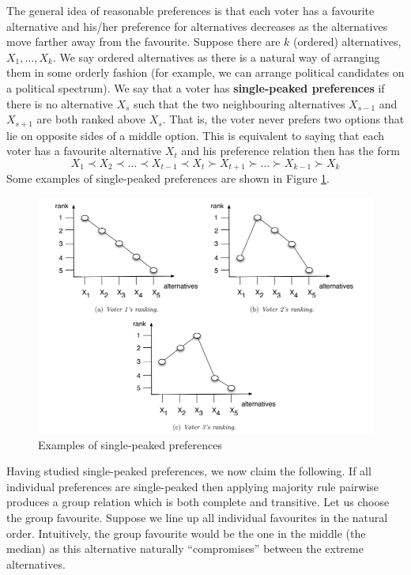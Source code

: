 \documentclass{article}
\theoremstyle{definition}
\begin{document}
The general idea of reasonable preferences is that each voter has a favourite alternative and his/her preference for alternatives decreases as the alternatives move farther away from the favourite. Suppose there are $k$ (ordered) alternatives, $X_1, \ldots , X_k$. We say ordered alternatives as there is a natural way of arranging them in some orderly fashion (for example, we can arrange political candidates on a political spectrum). We say that a voter has \textbf{single-peaked preferences} if there is no alternative $X_s$ such that the two neighbouring alternatives $X_{s-1}$ and $X_{s+1}$ are both ranked above $X_s$. That is, the voter never prefers two options that lie on opposite sides of a middle option. This is equivalent to saying that each voter has a favourite alternative $X_t$ and his preference relation then has the form
\[
    X_1 \prec X_2 \prec \ldots \prec X_{t-1} \prec X_t \succ X_{t+1} \succ \ldots \succ X_{k-1} \succ X_k
\]
Some examples of single-peaked preferences are shown in Figure \ref{fig:spp}.

\begin{figure}[h!]
    \centering
    \includegraphics[scale=0.6]{SPP.png}
    \caption{Examples of single-peaked preferences}
    \label{fig:spp}
\end{figure}

Having studied single-peaked preferences, we now claim the following. If all individual preferences are single-peaked then applying majority rule pairwise produces a group relation which is both complete and transitive. Let us choose the group favourite. Suppose we line up all individual favourites in the natural order. Intuitively, the group favourite would be the one in the middle (the median) as this alternative naturally ``compromises'' between the extreme alternatives. \medskip
\end{document}
